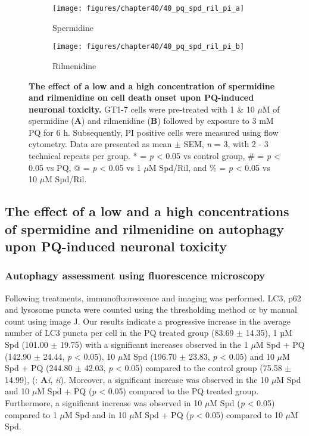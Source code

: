 \begin{figure}[H]
  \center
  \begin{subfigure}[b]{0.495\linewidth}
    \texttt{[image: figures/chapter40/40\_pq\_spd\_ril\_pi\_a]}
    \caption{Spermidine}
  \end{subfigure}
  \begin{subfigure}[b]{0.495\linewidth}
    \texttt{[image: figures/chapter40/40\_pq\_spd\_ril\_pi\_b]}
    \caption{Rilmenidine}
  \end{subfigure}
  \caption[The effect of a low and a high concentration of spermidine and rilmenidine on cell death onset upon PQ-induced neuronal toxicity]{\textbf{The effect of a low and a high concentration of spermidine and rilmenidine on cell death onset upon PQ-induced neuronal toxicity.} GT1-7 cells were pre-treated with 1 \& 10 $\mu$M of spermidine (\textbf{A}) and rilmenidine (\textbf{B}) followed by exposure to 3 mM PQ for 6 h. Subsequently, PI positive cells were measured using flow cytometry. Data are presented as mean $\pm$ SEM, \textit{n} = 3, with 2 - 3 technical repeats per group. * = \textit{p} < 0.05 vs control group, \# = \textit{p} < 0.05 vs PQ, @ = \textit{p} < 0.05 vs 1 $\mu$M Spd/Ril, and \% = \textit{p} < 0.05 vs 10 $\mu$M Spd/Ril.}
  \label{fig:40_pq_spd_ril_pi_a}
\end{figure}

\subsection{The effect of a low and a high concentrations of spermidine and rilmenidine on autophagy upon PQ-induced neuronal toxicity} 
\subsubsection{Autophagy assessment using fluorescence microscopy}
Following treatments, immunofluorescence and imaging was performed. LC3, p62 and lysosome puncta were counted using the thresholding method or by manual count using image J. Our results indicate a progressive increase in the average number of LC3 puncta per cell in the PQ treated group (83.69 $\pm$ 14.35), 1 µM Spd (101.00 $\pm$ 19.75) with a significant increases observed in the 1 $\mu$M Spd + PQ (142.90 $\pm$ 24.44, \textit{p} < 0.05), 10 $\mu$M Spd (196.70 $\pm$ 23.83, \textit{p} < 0.05) and 10 $\mu$M Spd + PQ (244.80 $\pm$ 42.03, \textit{p} < 0.05) compared to the control group (75.58 $\pm$ 14.99), (: \textbf{A}\textit{i}, \textit{ii}). Moreover, a significant increase was observed in the 10 $\mu$M Spd and 10 $\mu$M Spd + PQ (\textit{p} < 0.05) compared to the PQ treated group. Furthermore, a significant increase was observed in 10 $\mu$M Spd (\textit{p} < 0.05) compared to 1 $\mu$M Spd  and in 10 $\mu$M Spd + PQ (\textit{p} < 0.05) compared to 10 $\mu$M Spd.


